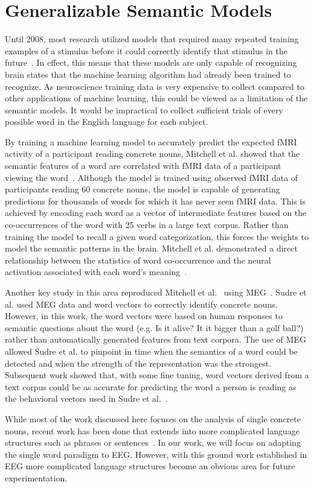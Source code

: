 \section{Generalizable Semantic Models}

Until 2008, most research utilized models that required many repeated training 
examples of a stimulus before it could correctly identify that stimulus in the 
future~\cite{kutas1980reading,kuperberg2007neural,Wang2002,Mitchell2002,Shinkareva2008,Gu2014}.
In effect, this means that these models are only capable of recognizing brain 
states that the machine learning algorithm had already been trained to 
recognize. As neuroscience training data is very expensive to collect compared 
to other applications of machine learning, this could be viewed as a limitation 
of the semantic models. It would be impractical to collect sufficient trials of 
every possible word in the English language for each subject.

By training a machine learning model to accurately predict the expected fMRI 
activity of a participant reading concrete nouns, Mitchell et al. showed that 
the semantic features of a word are correlated with fMRI data of a participant 
viewing the word~\cite{Mitchell2008}. Although the model is trained using 
observed fMRI data of participants reading 60 concrete nouns, the model is 
capable of generating predictions for thousands of words for which it has never 
seen fMRI data. This is achieved by encoding each word as a vector of 
intermediate features based on the co-occurrences of the word with 25 verbs in 
a large text corpus. Rather than training the model to recall a given word 
categorization, this forces the weights to model the semantic patterns in the 
brain. Mitchell et al. demonstrated a direct relationship between the 
statistics of word co-occurrence and the neural activation associated with each 
word's meaning~\cite{Mitchell2008}.

Another key study in this area reproduced Mitchell et al.~\cite{Mitchell2008} 
using MEG~\cite{Sudre2012}. Sudre et al. used MEG data and word vectors to 
correctly identify concrete nouns. However, in this work, the  word vectors 
were based on human responses to semantic questions about the word (e.g. Is it 
alive?  It it bigger than a golf ball?) rather than automatically generated 
features from text corpora. The use of MEG allowed Sudre et al. to pinpoint in 
time when the semantics of a word could be detected and when the strength of 
the representation was the strongest. Subsequent work showed that, with some 
fine tuning, word vectors derived from a text corpus could be as accurate for 
predicting the word a person is reading as the behavioral vectors used in Sudre 
et al.~\cite{Murphy2012}.

While most of the work discussed here focuses on the analysis of single 
concrete nouns, recent work has been done that extends into more complicated 
language structures such as phrases or sentences~\cite{Chang2009, afyshethesis, 
pereira2018toward}. In our work, we will focus on adapting the single word 
paradigm to EEG. However, with this ground work established in EEG more 
complicated language structures become an obvious area for future 
experimentation.
